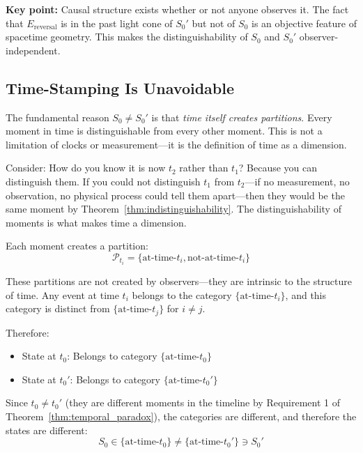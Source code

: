 \documentclass[twocolumn,10pt]{article}
\theoremstyle{definition}
\theoremstyle{remark}
\begin{document}
\vspace{0.2cm}
\noindent\textbf{Key point:} Causal structure exists whether or not anyone observes it. The fact that $E_{\text{reversal}}$ is in the past light cone of $S_0'$ but not of $S_0$ is an objective feature of spacetime geometry. This makes the distinguishability of $S_0$ and $S_0'$ observer-independent.

\subsection{Time-Stamping Is Unavoidable}

The fundamental reason $S_0 \neq S_0'$ is that \textit{time itself creates partitions}. Every moment in time is distinguishable from every other moment. This is not a limitation of clocks or measurement—it is the definition of time as a dimension.

\vspace{0.2cm}
\noindent Consider: How do you know it is now $t_2$ rather than $t_1$? Because you can distinguish them. If you could not distinguish $t_1$ from $t_2$—if no measurement, no observation, no physical process could tell them apart—then they would be the same moment by Theorem~\ref{thm:indistinguishability}. The distinguishability of moments is what makes time a dimension.

\vspace{0.2cm}
\noindent Each moment creates a partition:
\begin{equation}
\mathcal{P}_{t_i} = \{\text{at-time-}t_i, \text{not-at-time-}t_i\}
\end{equation}

\noindent These partitions are not created by observers—they are intrinsic to the structure of time. Any event at time $t_i$ belongs to the category $\{\text{at-time-}t_i\}$, and this category is distinct from $\{\text{at-time-}t_j\}$ for $i \neq j$.

\vspace{0.2cm}
\noindent Therefore:
\begin{itemize}
\item State at $t_0$: Belongs to category $\{\text{at-time-}t_0\}$
\item State at $t_0'$: Belongs to category $\{\text{at-time-}t_0'\}$
\end{itemize}

\noindent Since $t_0 \neq t_0'$ (they are different moments in the timeline by Requirement 1 of Theorem~\ref{thm:temporal_paradox}), the categories are different, and therefore the states are different:
\begin{equation}
S_0 \in \{\text{at-time-}t_0\} \neq \{\text{at-time-}t_0'\} \ni S_0'
\end{equation}
\end{document}
